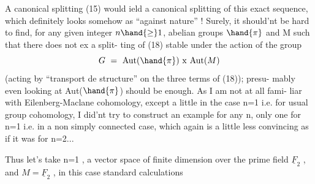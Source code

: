 A canonical splitting (15) would ield a canonical splitting of this
exact sequence, which definitely looks somehow as ``against nature'' !
Surely, it should'nt be hard to find, for any given integer $n \hand{\geq} 1$,
 abelian groups $\hand{\pi}$ and M\hand{,} such that there does not ex a split-%
ting of (18) stable under the action of the group
\[ G \ = \ \mathrm{Aut}(\hand{\pi}) \ \mathrm{x} \ \mathrm{Aut}(M) \]
(acting by ``transport de structure'' on the three terms of (18)); presu-%
mably even\hand{,} looking at Aut($\hand{\pi}$) should be enough. As I am not at all fami-%
liar with Eilenberg-Maclane cohomology, except a little in the case n=1
i.e. for usual group cohomology, I did'nt try to construct an example
for any n, only one for n=1 i.e. in a non simply connected case, which
again is a little less convincing as if it was  for n=2...

Thus let's take n=1 , a vector space of finite dimension over
the prime field $\underline{F}_2$ , and $M = \underline{F}_2$ , in this case standard calculations

